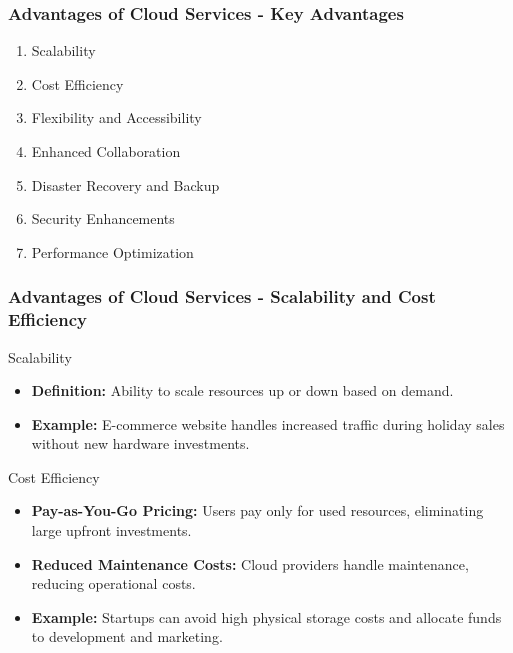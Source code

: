 \documentclass{beamer}
\begin{document}
\begin{frame}[fragile]
    \frametitle{Advantages of Cloud Services - Key Advantages}
    \begin{enumerate}
        \item Scalability
        \item Cost Efficiency
        \item Flexibility and Accessibility
        \item Enhanced Collaboration
        \item Disaster Recovery and Backup
        \item Security Enhancements
        \item Performance Optimization
    \end{enumerate}
\end{frame}

\begin{frame}[fragile]
    \frametitle{Advantages of Cloud Services - Scalability and Cost Efficiency}
    \begin{block}{Scalability}
        \begin{itemize}
            \item \textbf{Definition:} Ability to scale resources up or down based on demand.
            \item \textbf{Example:} E-commerce website handles increased traffic during holiday sales without new hardware investments.
        \end{itemize}
    \end{block}

    \begin{block}{Cost Efficiency}
        \begin{itemize}
            \item \textbf{Pay-as-You-Go Pricing:} Users pay only for used resources, eliminating large upfront investments.
            \item \textbf{Reduced Maintenance Costs:} Cloud providers handle maintenance, reducing operational costs.
            \item \textbf{Example:} Startups can avoid high physical storage costs and allocate funds to development and marketing.
        \end{itemize}
    \end{block}
\end{frame}
\end{document}
